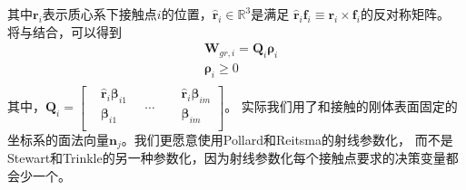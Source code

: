 其中${\boldsymbol{r}_{i}}$表示质心系下接触点$i$的位置，${{\hat{\boldsymbol{r}}}_{i}}\in {{\mathbb{R}}^{3}}$是满足
${{\hat{\boldsymbol{r}}}_{i}}{\boldsymbol{f}_{i}}\equiv {\boldsymbol{r}_{i}}\times {\boldsymbol{f}_{i}}$的反对称矩阵。
将与结合，可以得到
\begin{equation}
    \label{equ:wrench_matrix}
    \begin{aligned}
        & {{\boldsymbol{W}}_{gr,i}}={{\boldsymbol{Q}}_{i}}{{\boldsymbol{\rho}}_{i}} \\ 
       & {{\boldsymbol{\rho}}_{i}}\ge 0 \\ 
      \end{aligned}        
\end{equation}
其中，${{\boldsymbol{Q}}_{i}}=\left[ \begin{aligned}
    & {{{\hat{\boldsymbol{r}}}}_{i}}{{\boldsymbol{\beta}}_{i1}} \\ 
   & {{\boldsymbol{\beta}}_{i1}}\ \ \ \  \\ 
  \end{aligned} \right.\ \ \ \ \cdots \ \ \ \ \left. \begin{aligned}
    & {{{\hat{\boldsymbol{r}}}}_{i}}{{\boldsymbol{\beta}}_{im}} \\ 
   & {{\boldsymbol{\beta}}_{im}} \\ 
  \end{aligned} \right]
  $。
  实际我们用了和接触的刚体表面固定的坐标系的面法向量${{\boldsymbol{n}}_{j}}$。我们更愿意使用Pollard和Reitsma的射线参数化，
  而不是Stewart和Trinkle的另一种参数化，因为射线参数化每个接触点要求的决策变量都会少一个。

